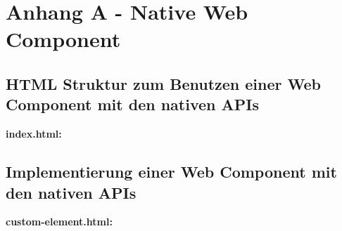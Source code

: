 \chapter*{Anhang A - Native Web Component}\label{anhang-a---native-web-component}

\section*{HTML Struktur zum Benutzen einer Web Component mit den nativen APIs}\label{html-struktur-zum-benutzen-einer-web-component-mit-den-nativen-apis}

\textbf{index.html:}

\begin{Shaded}
\begin{Highlighting}[]
\DataTypeTok{>}
\KeywordTok{>}
  \KeywordTok{>}

  \KeywordTok{>}

  \KeywordTok{>}

\end{Highlighting}
\end{Shaded}

\section*{Implementierung einer Web Component mit den nativen APIs}\label{implementierung-einer-web-component-mit-den-nativen-apis}

\textbf{custom-element.html:}

